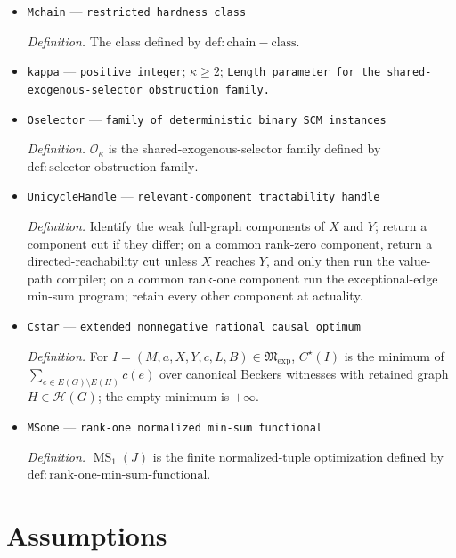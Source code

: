\documentclass{article}
\begin{document}
\begin{itemize}
  \par\smallskip\noindent\emph{Definition.} The replay verifier in \(\mathrm{def:verifier-handle}\).
  \item \texttt{Mchain} --- \texttt{restricted hardness class}
  \par\smallskip\noindent\emph{Definition.} The class defined by \(\mathrm{def:chain-class}\).
  \item \texttt{kappa} --- \texttt{positive integer}; \(\kappa\ge 2\); \texttt{Length parameter for the shared-\allowbreak{}exogenous-\allowbreak{}selector obstruction family.}
  \item \texttt{Oselector} --- \texttt{family of deterministic binary SCM instances}
  \par\smallskip\noindent\emph{Definition.} \(\mathcal O_{\kappa}\) is the shared-exogenous-selector family defined by \(\mathrm{def:selector\mbox{-}obstruction\mbox{-}family}\).
  \item \texttt{UnicycleHandle} --- \texttt{relevant-\allowbreak{}component tractability handle}
  \par\smallskip\noindent\emph{Definition.} Identify the weak full-graph components of \(X\) and \(Y\); return a component cut if they differ; on a common rank-zero component, return a directed-reachability cut unless \(X\) reaches \(Y\), and only then run the value-path compiler; on a common rank-one component run the exceptional-edge min-sum program; retain every other component at actuality.
  \item \texttt{Cstar} --- \texttt{extended nonnegative rational causal optimum}
  \par\smallskip\noindent\emph{Definition.} For \(I=(M,a,X,Y,c,L,B)\in\mathfrak M_{\mathrm{exp}}\), \(C^\star(I)\) is the minimum of \(\sum_{e\in E(G)\setminus E(H)}c(e)\) over canonical Beckers witnesses with retained graph \(H\in\mathcal H(G)\); the empty minimum is \(+\infty\).
  \item \texttt{MSone} --- \texttt{rank-\allowbreak{}one normalized min-\allowbreak{}sum functional}
  \par\smallskip\noindent\emph{Definition.} \(\operatorname{MS}_1(J)\) is the finite normalized-tuple optimization defined by \(\mathrm{def:rank\mbox{-}one\mbox{-}min\mbox{-}sum\mbox{-}functional}\).
\end{itemize}

\section{Assumptions}
\end{document}
